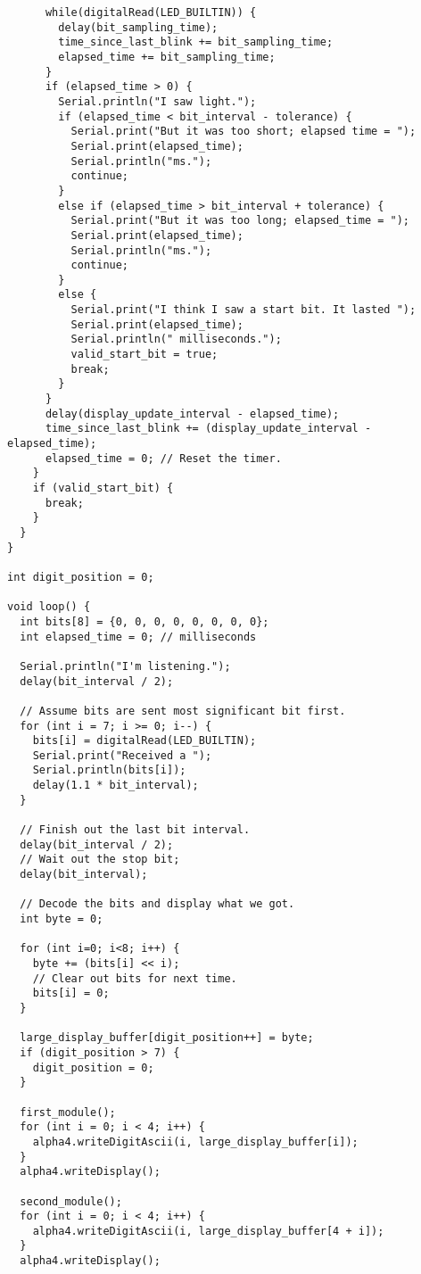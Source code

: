 \documentclass[a4paper,notitlepage]{article}
\begin{document}
\begin{verbatim}
      while(digitalRead(LED_BUILTIN)) {
        delay(bit_sampling_time);
        time_since_last_blink += bit_sampling_time;
        elapsed_time += bit_sampling_time;
      }
      if (elapsed_time > 0) {
        Serial.println("I saw light.");
        if (elapsed_time < bit_interval - tolerance) {
          Serial.print("But it was too short; elapsed time = ");
          Serial.print(elapsed_time);
          Serial.println("ms.");
          continue;
        }
        else if (elapsed_time > bit_interval + tolerance) {
          Serial.print("But it was too long; elapsed_time = ");
          Serial.print(elapsed_time);
          Serial.println("ms.");
          continue;
        }
        else {
          Serial.print("I think I saw a start bit. It lasted ");
          Serial.print(elapsed_time);
          Serial.println(" milliseconds.");
          valid_start_bit = true;
          break;
        }
      }
      delay(display_update_interval - elapsed_time);
      time_since_last_blink += (display_update_interval - elapsed_time);
      elapsed_time = 0; // Reset the timer.
    }
    if (valid_start_bit) {
      break;
    }
  }
}

int digit_position = 0;

void loop() {
  int bits[8] = {0, 0, 0, 0, 0, 0, 0, 0};
  int elapsed_time = 0; // milliseconds

  Serial.println("I'm listening.");
  delay(bit_interval / 2);

  // Assume bits are sent most significant bit first.
  for (int i = 7; i >= 0; i--) {
    bits[i] = digitalRead(LED_BUILTIN);
    Serial.print("Received a ");
    Serial.println(bits[i]);
    delay(1.1 * bit_interval);
  }

  // Finish out the last bit interval.
  delay(bit_interval / 2);
  // Wait out the stop bit;
  delay(bit_interval);

  // Decode the bits and display what we got.
  int byte = 0;

  for (int i=0; i<8; i++) {
    byte += (bits[i] << i);
    // Clear out bits for next time.
    bits[i] = 0;
  }

  large_display_buffer[digit_position++] = byte;
  if (digit_position > 7) {
    digit_position = 0;
  }

  first_module();
  for (int i = 0; i < 4; i++) {
    alpha4.writeDigitAscii(i, large_display_buffer[i]);
  }
  alpha4.writeDisplay();

  second_module();
  for (int i = 0; i < 4; i++) {
    alpha4.writeDigitAscii(i, large_display_buffer[4 + i]);
  }
  alpha4.writeDisplay();


\end{verbatim}
\end{document}
